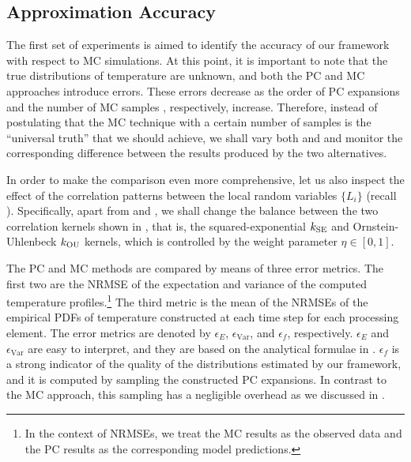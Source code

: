 \subsection{Approximation Accuracy}

The first set of experiments is aimed to identify the accuracy of our framework
with respect to MC simulations. At this point, it is important to note that the
true distributions of temperature are unknown, and both the PC and MC approaches
introduce errors. These errors decrease as the order of PC expansions \lc and
the number of MC samples \ns, respectively, increase. Therefore, instead of
postulating that the MC technique with a certain number of samples is the
``universal truth'' that we should achieve, we shall vary both \lc and \ns and
monitor the corresponding difference between the results produced by the two
alternatives.

In order to make the comparison even more comprehensive, let us also inspect the
effect of the correlation patterns between the local random variables $\{ L_i
\}$ (recall ). Specifically, apart from \lc and \ns,
we shall change the balance between the two correlation kernels shown in
, that is, the squared-exponential $k_{\mathrm{SE}}$ and
Ornstein-Uhlenbeck $k_{\mathrm{OU}}$ kernels, which is controlled by the weight parameter
$\eta \in [0, 1]$.

The PC and MC methods are compared by means of three error metrics. The first
two are the \acf{NRMSE} of the expectation and variance of the computed
temperature profiles.\footnote{In the context of \acp{NRMSE}, we treat the MC
results as the observed data and the PC results as the corresponding model
predictions.} The third metric is the mean of the \acp{NRMSE} of the empirical
PDFs of temperature constructed at each time step for each processing element.
The error metrics are denoted by $\epsilon_E$, $\epsilon_\mathrm{Var}$, and $\epsilon_f$,
respectively. $\epsilon_E$ and $\epsilon_\mathrm{Var}$ are easy to interpret, and they are based
on the analytical formulae in . $\epsilon_f$ is a strong
indicator of the quality of the distributions estimated by our framework, and it
is computed by sampling the constructed PC expansions. In contrast to the MC
approach, this sampling has a negligible overhead as we discussed in
.

